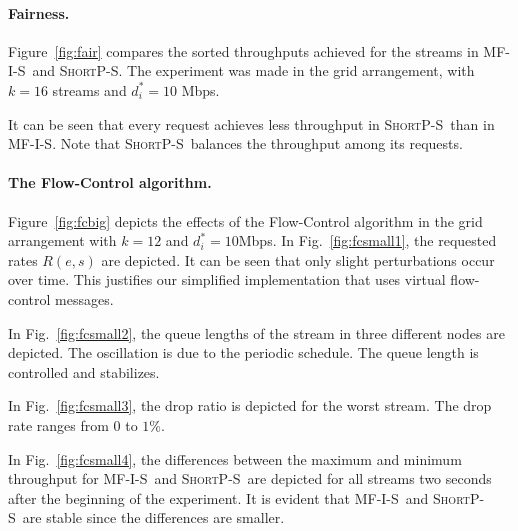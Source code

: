 \documentclass[12pt]{article}
\newenvironment{proof sketch}[1]{\noindent {\emph{Proof sketch of #1:}}}{\hfill \qed}
\newcommand{\algA}{\textsc{MF-I-S}}
\newcommand{\algBS}{\textsc{ShortP-S}}
\begin{document}
\paragraph{Fairness.}
Figure~\ref{fig:fair} compares the sorted throughputs achieved for the
streams in \algA\ and \algBS.  The experiment was made in the grid
arrangement, with $k=16$ streams and $d^*_i=10$ Mbps.

It can be seen that every request achieves less throughput in \algBS\ than in \algA.
Note that \algBS\ balances the throughput among its requests.

\paragraph{The Flow-Control algorithm.}

Figure~\ref{fig:fcbig} depicts the effects of the Flow-Control
algorithm in the grid arrangement with $k=12$ and $d^*_i=10$Mbps.  In
Fig.~\ref{fig:fcsmall1}, the requested rates $R(e,s)$ are depicted. It
can be seen that only slight perturbations occur over time. This
justifies our simplified implementation that uses virtual flow-control messages.

In Fig.~\ref{fig:fcsmall2}, the queue lengths of the stream in three
different nodes are depicted.  The oscillation is due to the periodic
schedule. The queue length is controlled and stabilizes.

In Fig.~\ref{fig:fcsmall3}, the drop ratio is depicted for the worst
stream. The drop rate ranges from $0$ to $1$\%.

In Fig.~\ref{fig:fcsmall4}, the differences between the maximum and
minimum throughput for \algA\ and \algBS\ are depicted for all streams
two seconds after the beginning of the experiment.
It is evident that \algA\ and \algBS\ are stable since the differences are smaller.

\end{document}
